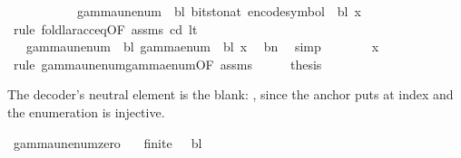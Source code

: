 \begin{isabellebody}
\ \ \ \ \ \ \ \ \ \ {\isacharequal}{\kern0pt}\ gamma{\isacharunderscore}{\kern0pt}unenum\ {\isasymGamma}\ bl\ {\isacharparenleft}{\kern0pt}bits{\isacharunderscore}{\kern0pt}to{\isacharunderscore}{\kern0pt}nat\ {\isacharparenleft}{\kern0pt}encode{\isacharunderscore}{\kern0pt}symbol\ {\isasymGamma}\ bl\ x{\isacharparenright}{\kern0pt}{\isacharparenright}{\kern0pt}{\isachardoublequoteclose}\isanewline
\ \ \ \ \isamarkupfalse%
\ {\isacharparenleft}{\kern0pt}rule\ foldl{\isacharunderscore}{\kern0pt}ar{\isacharunderscore}{\kern0pt}acc{\isacharunderscore}{\kern0pt}eq{\isacharbrackleft}{\kern0pt}OF\ assms{\isacharparenleft}{\kern0pt}{}{\isacharparenright}{\kern0pt}\ cd\ lt{\isacharbrackright}{\kern0pt}{\isacharparenright}{\kern0pt}\isanewline
\ \ \isamarkupfalse%
\ \isamarkupfalse%
\ {\isachardoublequoteopen}{\isasymdots}\ {\isacharequal}{\kern0pt}\ gamma{\isacharunderscore}{\kern0pt}unenum\ {\isasymGamma}\ bl\ {\isacharparenleft}{\kern0pt}gamma{\isacharunderscore}{\kern0pt}enum\ {\isasymGamma}\ bl\ x{\isacharparenright}{\kern0pt}{\isachardoublequoteclose}\ \isamarkupfalse%
\ bn\ \isamarkupfalse%
\ simp\isanewline
\ \ \isamarkupfalse%
\ \isamarkupfalse%
\ {\isachardoublequoteopen}{\isasymdots}\ {\isacharequal}{\kern0pt}\ x{\isachardoublequoteclose}\ \isamarkupfalse%
\ {\isacharparenleft}{\kern0pt}rule\ gamma{\isacharunderscore}{\kern0pt}unenum{\isacharunderscore}{\kern0pt}gamma{\isacharunderscore}{\kern0pt}enum{\isacharbrackleft}{\kern0pt}OF\ assms{\isacharbrackright}{\kern0pt}{\isacharparenright}{\kern0pt}\isanewline
\ \ \isamarkupfalse%
\ \isamarkupfalse%
\ {\isacharquery}{\kern0pt}thesis\ \isakeywordONE{{\isachardot}{\kern0pt}}\isamarkupfalse%
\isanewline
{}\isamarkupfalse%
%
\endisatagproof
{\isafoldproof}%
%
\isadelimproof
%
\endisadelimproof
%
\begin{isamarkuptext}%
The decoder's neutral element is the blank: , since the anchor puts  at index
   and the enumeration is injective.%
\end{isamarkuptext}\isamarkuptrue%
\isamarkupfalse%
\ gamma{\isacharunderscore}{\kern0pt}unenum{\isacharunderscore}{\kern0pt}zero{\isacharcolon}{\kern0pt}\isanewline
\ \ \ {\isachardoublequoteopen}finite\ {\isasymGamma}{\isachardoublequoteclose}\ \ {\isachardoublequoteopen}bl\ {\isasymin}\ {\isasymGamma}{\isachardoublequoteclose}\isanewline

\end{isabellebody}
